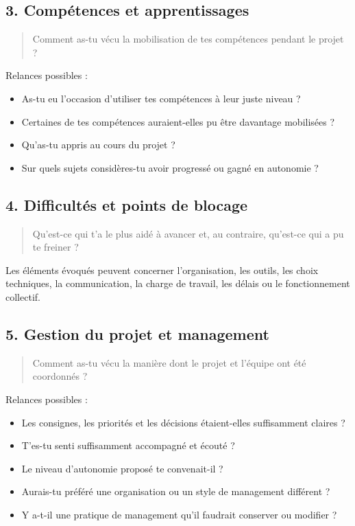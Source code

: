 \subsection*{3. Compétences et apprentissages}

\begin{quote}
Comment as-tu vécu la mobilisation de tes compétences pendant le projet ?
\end{quote}

Relances possibles :

\begin{itemize}
    \item As-tu eu l'occasion d'utiliser tes compétences à leur juste niveau ?
    \item Certaines de tes compétences auraient-elles pu être davantage mobilisées ?
    \item Qu'as-tu appris au cours du projet ?
    \item Sur quels sujets considères-tu avoir progressé ou gagné en autonomie ?
\end{itemize}

\subsection*{4. Difficultés et points de blocage}

\begin{quote}
Qu'est-ce qui t'a le plus aidé à avancer et, au contraire, qu'est-ce qui a pu te freiner ?
\end{quote}

Les éléments évoqués peuvent concerner l'organisation, les outils, les choix techniques, la communication, la charge de travail, les délais ou le fonctionnement collectif.

\subsection*{5. Gestion du projet et management}

\begin{quote}
Comment as-tu vécu la manière dont le projet et l'équipe ont été coordonnés ?
\end{quote}

Relances possibles :

\begin{itemize}
    \item Les consignes, les priorités et les décisions étaient-elles suffisamment claires ?
    \item T'es-tu senti suffisamment accompagné et écouté ?
    \item Le niveau d'autonomie proposé te convenait-il ?
    \item Aurais-tu préféré une organisation ou un style de management différent ?
    \item Y a-t-il une pratique de management qu'il faudrait conserver ou modifier ?
\end{itemize}

